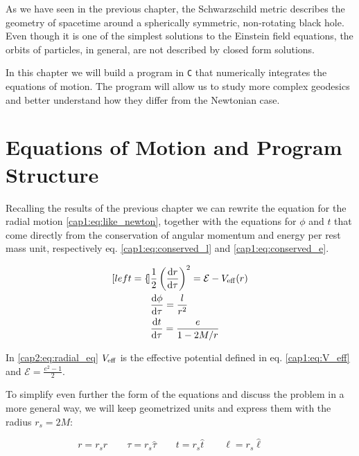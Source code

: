
As we have seen in the previous chapter, the Schwarzschild metric describes the
geometry of spacetime around a spherically symmetric, non-rotating black hole.
Even though it is one of the simplest solutions to the Einstein field equations,
the orbits of particles, in general, are not described by closed form solutions.

In this chapter we will build a program in \texttt{C} that numerically
integrates the equations of motion.
The program will allow us to study more complex geodesics and better understand
how they differ from the Newtonian case.


\section{Equations of Motion and Program Structure}
\label{cap2:sec:eq_of_motion}

Recalling the results of the previous chapter we can rewrite the equation for
the radial motion \ref{cap1:eq:like_newton}, together with the equations for
$\phi$ and $t$ that come directly from the conservation of angular momentum and
energy per rest mass unit, respectively eq. \ref{cap1:eq:conserved_l} and
\ref{cap1:eq:conserved_e}.

\begin{subequations}
\label{cap2:eq:eq_of_motion}
	\begin{align}[left = {\empheqlbrace}]
        &\frac{1}{2} \left(\dv{r}{\tau}\right)^2 = \mathcal E - V_{\rm eff} (r)
        \label{cap2:eq:radial_eq} \\
        &\dv{\phi}{\tau} = \frac{l}{r^2} \\
        &\dv{t}{\tau} = \frac{e}{1 - 2 M / r}
	\end{align}
\end{subequations}

In \ref{cap2:eq:radial_eq} $V_{\rm eff}$ is the effective potential defined in eq.
\ref{cap1:eq:V_eff} and $\mathcal E = \frac{e^2 - 1}{2}$.

To simplify even further the form of the equations and discuss the problem in a
more general way, we will keep geometrized units and express them with the \Sh
radius $r_s = 2 M$:

\begin{equation}
    r = r_s \hat r \quad \quad
    \tau = r_s \hat \tau \quad \quad
    t = r_s \hat t \quad \quad
    \ell = r_s \hat \ell \quad \quad
\end{equation}


